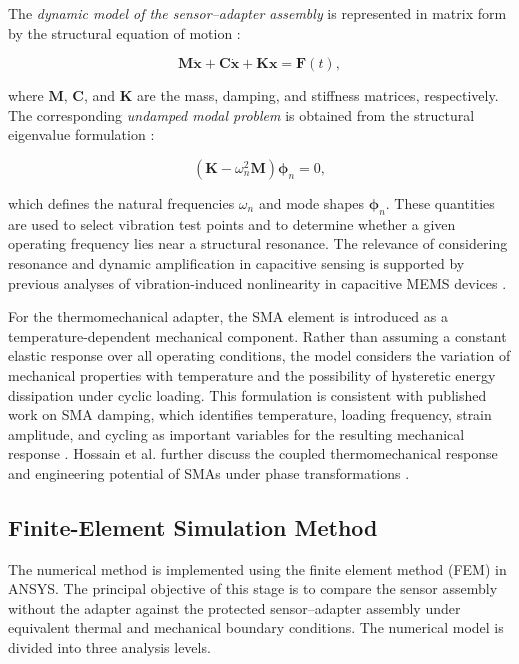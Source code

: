 \documentclass[conference]{IEEEtran}
\begin{document}
The \textit{dynamic model of the sensor--adapter assembly} is represented in matrix form by the structural equation of motion \cite{Zhang2024,Davarnia2025}:

\begin{equation}
\mathbf{M}\ddot{\mathbf{x}}+\mathbf{C}\dot{\mathbf{x}}+\mathbf{K}\mathbf{x}=\mathbf{F}(t),
\label{eq:dynamic}
\end{equation}

where $\mathbf{M}$, $\mathbf{C}$, and $\mathbf{K}$ are the mass, damping, and stiffness matrices, respectively. The corresponding \textit{undamped modal problem} is obtained from the structural eigenvalue formulation \cite{Zhang2024,Zaitsev2022}:

\begin{equation}
\left(\mathbf{K}-\omega_n^2\mathbf{M}\right)\boldsymbol{\phi}_n=0,
\label{eq:modal}
\end{equation}

which defines the natural frequencies $\omega_n$ and mode shapes $\boldsymbol{\phi}_n$. These quantities are used to select vibration test points and to determine whether a given operating frequency lies near a structural resonance. The relevance of considering resonance and dynamic amplification in capacitive sensing is supported by previous analyses of vibration-induced nonlinearity in capacitive MEMS devices \cite{Zhang2024}.

For the thermomechanical adapter, the SMA element is introduced as a temperature-dependent mechanical component. Rather than assuming a constant elastic response over all operating conditions, the model considers the variation of mechanical properties with temperature and the possibility of hysteretic energy dissipation under cyclic loading. This formulation is consistent with published work on SMA damping, which identifies temperature, loading frequency, strain amplitude, and cycling as important variables for the resulting mechanical response \cite{Saedi2023,Davarnia2025}. Hossain et al. further discuss the coupled thermomechanical response and engineering potential of SMAs under phase transformations \cite{Hossain2025}.

\subsection{Finite-Element Simulation Method}

The numerical method is implemented using the finite element method (FEM) in ANSYS. The principal objective of this stage is to compare the sensor assembly without the adapter against the protected sensor--adapter assembly under equivalent thermal and mechanical boundary conditions. The numerical model is divided into three analysis levels.
\end{document}
